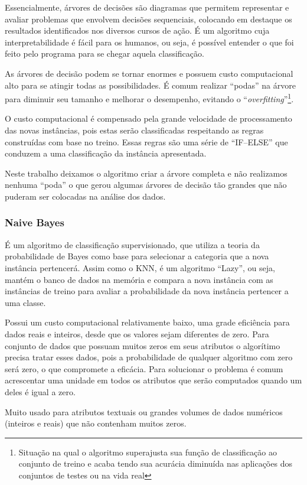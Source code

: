 \documentclass[12pt, a4paper]{article}
\begin{document}
Essencialmente, árvores de decisões são diagramas que permitem representar e avaliar problemas que envolvem decisões sequenciais, colocando em destaque os resultados identificados nos diversos cursos de ação. É um algoritmo cuja interpretabilidade é fácil para os humanos, ou seja, é possível entender o que foi feito pelo programa para se chegar aquela classificação.

As árvores de decisão podem se tornar enormes e possuem custo computacional alto para se atingir todas as possibilidades. É comum realizar ``podas'' na árvore para diminuir seu tamanho e melhorar o desempenho, evitando o ``\textit{overfitting}''\footnote{Situação na qual o algoritmo superajusta sua função de classificação ao conjunto de treino e acaba tendo sua acurácia diminuída nas aplicações dos conjuntos de testes ou na vida real}.

O custo computacional é compensado pela grande velocidade de processamento das novas instâncias, pois estas serão classificadas respeitando as regras construídas com base no treino. Essas regras são uma série de ``IF--ELSE'' que conduzem a uma classificação da instância apresentada.

Neste trabalho deixamos o algoritmo criar a árvore completa e não realizamos nenhuma ``poda'' o que gerou algumas árvores de decisão tão grandes que não puderam ser colocadas na análise dos dados.

\subsubsection{Naive Bayes}
É um algoritmo de classificação supervisionado, que utiliza a teoria da probabilidade de Bayes como base para selecionar a categoria que a nova instância pertencerá. Assim como o KNN, é um algoritmo ``Lazy'', ou seja, mantém o banco de dados na memória e compara a nova instância com as instâncias de treino para avaliar a probabilidade da nova instância pertencer a uma classe.

Possui um custo computacional relativamente baixo, uma grade eficiência para dados reais e inteiros, desde que os valores sejam diferentes de zero. Para conjunto de dados que possuam muitos zeros em seus atributos o algorítimo precisa tratar esses dados, pois a probabilidade de qualquer algoritmo com zero será zero, o que compromete a eficácia. Para solucionar o problema é comum acrescentar uma unidade em todos os atributos que serão computados quando um deles é igual a zero.

Muito usado para atributos textuais ou grandes volumes de dados numéricos (inteiros e reais) que não contenham muitos zeros.
\end{document}
